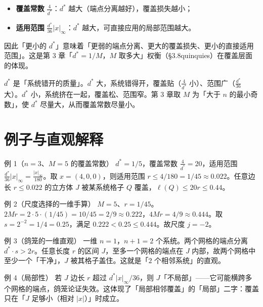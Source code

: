 \documentclass[a4paper,11pt,openany]{ctexbook}
\numberwithin{equation}{chapter}
\numberwithin{figure}{chapter}
\numberwithin{table}{chapter}
\begin{document}
\begin{itemize}
\item \textbf{覆盖常数} $\frac4{d^*}$：$d^*$ 越大（端点分离越好），覆盖损失越小；
\item \textbf{适用范围} $\frac{d^*}{36}|x|_\infty$：$d^*$ 越大，可直接应用的局部范围越大。
\end{itemize}

因此「更小的 $d^*$」意味着「更弱的端点分离、更大的覆盖损失、更小的直接适用范围」。这是第 3 章「$d^*=1/M$，$M$ 取多大」权衡（§3.8quinquies）在覆盖层面的体现。

\begin{intuitionbox}
$d^*$ 是「系统错开的质量」。$d^*$ 大，系统错得开，覆盖贴（$\frac4{d^*}$ 小）、范围广（$\frac{d^*}{36}$ 大）。$d^*$ 小，系统挤在一起，覆盖松、范围窄。第 3 章取 $M$ 为「大于 $n$ 的最小奇数」，使 $d^*$ 尽量大，从而覆盖常数尽量小。
\end{intuitionbox}

\section{例子与直观解释}

\begin{examplebox}{例 1（$n=3$、$M=5$ 的覆盖常数）}
$d^*=1/5$，覆盖常数 $\frac4{d^*}=20$，适用范围 $\frac{d^*}{36}|x|_\infty=\frac{|x|_\infty}{180}$。取 $x=(4,0,0)$，则适用范围 $r\le4/180=1/45\approx0.022$。任意边长 $r\le0.022$ 的立方体 $J$ 被某系统格子 $Q$ 覆盖，$\ell(Q)\le20r\le0.44$。
\end{examplebox}

\begin{examplebox}{例 2（尺度选择的一维手算）}
$M=5$、$r=1/45$。$2Mr=2\cdot5\cdot(1/45)=10/45=2/9\approx0.222$，$4Mr=4/9\approx0.444$。取 $s=2^{-2}=1/4=0.25$，满足 $0.222<0.25\le0.444$。故尺度 $j=-2$。
\end{examplebox}

\begin{examplebox}{例 3（鸽笼的一维直观）}
一维 $n=1$，$n+1=2$ 个系统。两个网格的端点分离 $d^*\cdot s>2r$。任意长度 $r$ 的区间 $J$，至多一个网格的端点在 $J$ 内部，故两个网格中至少一个「干净」，$J$ 被其格子盖住。这就是「$2$ 个相邻系统」的直观。
\end{examplebox}

\begin{examplebox}{例 4（局部性）}
若 $J$ 边长 $r$ 超过 $d^*|x|_\infty/36$，则 $J$「不局部」——它可能横跨多个网格的端点，鸽笼论证失效。这体现了「局部相邻覆盖」的「局部」二字：覆盖只在「$J$ 足够小（相对 $|x|$）」时成立。
\end{examplebox}
\end{document}
